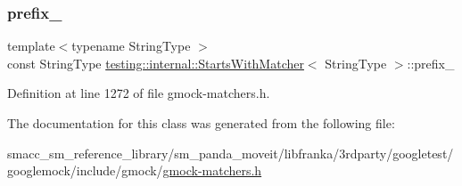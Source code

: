 \subsubsection{\texorpdfstring{prefix\+\_\+}{prefix\_}}
{\footnotesize\ttfamily template$<$typename String\+Type $>$ \\
const String\+Type \hyperlink{classtesting_1_1internal_1_1StartsWithMatcher}{testing\+::internal\+::\+Starts\+With\+Matcher}$<$ String\+Type $>$\+::prefix\+\_\+\hspace{0.3cm}{\ttfamily [private]}}



Definition at line 1272 of file gmock-\/matchers.\+h.



The documentation for this class was generated from the following file\+:\begin{DoxyCompactItemize}
\item 
smacc\+\_\+sm\+\_\+reference\+\_\+library/sm\+\_\+panda\+\_\+moveit/libfranka/3rdparty/googletest/googlemock/include/gmock/\hyperlink{gmock-matchers_8h}{gmock-\/matchers.\+h}\end{DoxyCompactItemize}
